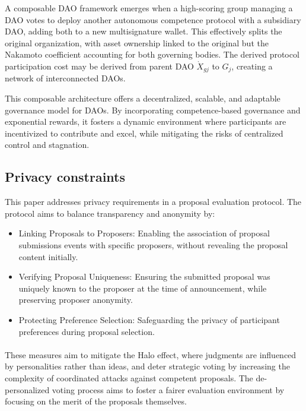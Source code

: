 \documentclass{article}
\begin{document}
\begin{CJK}{UTF8}{gbsn}
\begin{multicols}{2}
            

            A composable DAO framework emerges when a high-scoring group managing a DAO votes to deploy another autonomous competence protocol with a subsidiary DAO, adding both to a new multisignature wallet. This effectively splits the original organization, with asset ownership linked to the original but the Nakamoto coefficient accounting for both governing bodies. The derived protocol participation cost may be derived from parent DAO  $ \grave{X}_{gj}$ to $G_j$, creating a network of interconnected DAOs.

        This composable architecture offers a decentralized, scalable, and adaptable governance model for DAOs. By incorporating competence-based governance and exponential rewards, it fosters a dynamic environment where participants are incentivized to contribute and excel, while mitigating the risks of centralized control and stagnation.


        \subsection{Privacy constraints}

        This paper addresses privacy requirements in a proposal evaluation protocol. The protocol aims to balance transparency and anonymity by:
        \begin{itemize}
            \item Linking Proposals to Proposers: Enabling the association of proposal submissions events with specific proposers, without revealing the proposal content initially.
            \item Verifying Proposal Uniqueness: Ensuring the submitted proposal was uniquely known to the proposer at the time of announcement, while preserving proposer anonymity.
            \item Protecting Preference Selection: Safeguarding the privacy of participant preferences during proposal selection.

        \end{itemize}
        \paragraph{}

        These measures aim to mitigate the Halo effect, where judgments are influenced by personalities rather than ideas, and deter strategic voting by increasing the complexity of coordinated attacks against competent proposals. The de-personalized voting process aims to foster a fairer evaluation environment by focusing on the merit of the proposals themselves.


\end{multicols}
\end{CJK}
\end{document}
